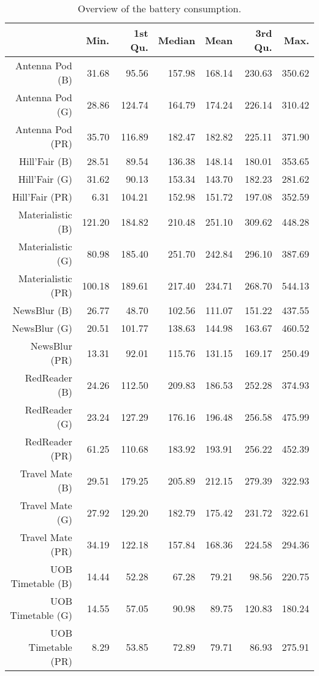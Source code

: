 \begin{table}[ht]
\centering
\begin{tabular}{rrrrrrr}
  \hline
 & Min. & 1st Qu. & Median & Mean & 3rd Qu. & Max. \\ 
  \hline
Antenna Pod (B) & 31.68 & 95.56 & 157.98 & 168.14 & 230.63 & 350.62 \\ 
  Antenna Pod (G) & 28.86 & 124.74 & 164.79 & 174.24 & 226.14 & 310.42 \\ 
  Antenna Pod (PR) & 35.70 & 116.89 & 182.47 & 182.82 & 225.11 & 371.90 \\ 
  Hill'Fair (B) & 28.51 & 89.54 & 136.38 & 148.14 & 180.01 & 353.65 \\ 
  Hill'Fair (G) & 31.62 & 90.13 & 153.34 & 143.70 & 182.23 & 281.62 \\ 
  Hill'Fair (PR) & 6.31 & 104.21 & 152.98 & 151.72 & 197.08 & 352.59 \\ 
  Materialistic (B) & 121.20 & 184.82 & 210.48 & 251.10 & 309.62 & 448.28 \\ 
  Materialistic (G) & 80.98 & 185.40 & 251.70 & 242.84 & 296.10 & 387.69 \\ 
  Materialistic (PR) & 100.18 & 189.61 & 217.40 & 234.71 & 268.70 & 544.13 \\ 
  NewsBlur (B) & 26.77 & 48.70 & 102.56 & 111.07 & 151.22 & 437.55 \\ 
  NewsBlur (G) & 20.51 & 101.77 & 138.63 & 144.98 & 163.67 & 460.52 \\ 
  NewsBlur (PR) & 13.31 & 92.01 & 115.76 & 131.15 & 169.17 & 250.49 \\ 
  RedReader (B) & 24.26 & 112.50 & 209.83 & 186.53 & 252.28 & 374.93 \\ 
  RedReader (G) & 23.24 & 127.29 & 176.16 & 196.48 & 256.58 & 475.99 \\ 
  RedReader (PR) & 61.25 & 110.68 & 183.92 & 193.91 & 256.22 & 452.39 \\ 
  Travel Mate (B) & 29.51 & 179.25 & 205.89 & 212.15 & 279.39 & 322.93 \\ 
  Travel Mate (G) & 27.92 & 129.20 & 182.79 & 175.42 & 231.72 & 322.61 \\ 
  Travel Mate (PR) & 34.19 & 122.18 & 157.84 & 168.36 & 224.58 & 294.36 \\ 
  UOB Timetable (B) & 14.44 & 52.28 & 67.28 & 79.21 & 98.56 & 220.75 \\ 
  UOB Timetable (G) & 14.55 & 57.05 & 90.98 & 89.75 & 120.83 & 180.24 \\ 
  UOB Timetable (PR) & 8.29 & 53.85 & 72.89 & 79.71 & 86.93 & 275.91 \\ 
   \hline
\end{tabular}
\caption{Overview of the battery consumption.} 
\label{tab:results:rq1:summary:battery}
\end{table}
